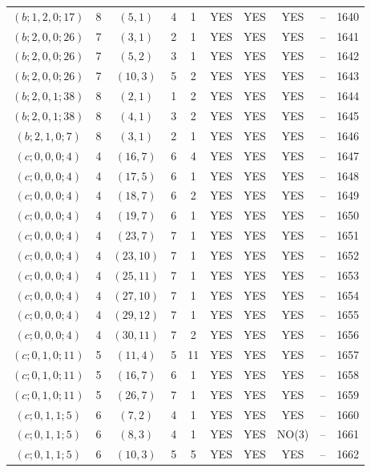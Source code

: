 \begin{longtable}{|c|c|c|c|c|c|c|c|c|c|}
$(b; 1, 2, 0; 17)$ & 8 & $(5, 1)$ & 4 & 1 & YES & YES & YES & -- & 1640\\
$(b; 2, 0, 0; 26)$ & 7 & $(3, 1)$ & 2 & 1 & YES & YES & YES & -- & 1641\\
$(b; 2, 0, 0; 26)$ & 7 & $(5, 2)$ & 3 & 1 & YES & YES & YES & -- & 1642\\
$(b; 2, 0, 0; 26)$ & 7 & $(10, 3)$ & 5 & 2 & YES & YES & YES & -- & 1643\\
$(b; 2, 0, 1; 38)$ & 8 & $(2, 1)$ & 1 & 2 & YES & YES & YES & -- & 1644\\
$(b; 2, 0, 1; 38)$ & 8 & $(4, 1)$ & 3 & 2 & YES & YES & YES & -- & 1645\\
$(b; 2, 1, 0; 7)$ & 8 & $(3, 1)$ & 2 & 1 & YES & YES & YES & -- & 1646\\
$(c; 0, 0, 0; 4)$ & 4 & $(16, 7)$ & 6 & 4 & YES & YES & YES & -- & 1647\\
$(c; 0, 0, 0; 4)$ & 4 & $(17, 5)$ & 6 & 1 & YES & YES & YES & -- & 1648\\
$(c; 0, 0, 0; 4)$ & 4 & $(18, 7)$ & 6 & 2 & YES & YES & YES & -- & 1649\\
$(c; 0, 0, 0; 4)$ & 4 & $(19, 7)$ & 6 & 1 & YES & YES & YES & -- & 1650\\
$(c; 0, 0, 0; 4)$ & 4 & $(23, 7)$ & 7 & 1 & YES & YES & YES & -- & 1651\\
$(c; 0, 0, 0; 4)$ & 4 & $(23, 10)$ & 7 & 1 & YES & YES & YES & -- & 1652\\
$(c; 0, 0, 0; 4)$ & 4 & $(25, 11)$ & 7 & 1 & YES & YES & YES & -- & 1653\\
$(c; 0, 0, 0; 4)$ & 4 & $(27, 10)$ & 7 & 1 & YES & YES & YES & -- & 1654\\
$(c; 0, 0, 0; 4)$ & 4 & $(29, 12)$ & 7 & 1 & YES & YES & YES & -- & 1655\\
$(c; 0, 0, 0; 4)$ & 4 & $(30, 11)$ & 7 & 2 & YES & YES & YES & -- & 1656\\
$(c; 0, 1, 0; 11)$ & 5 & $(11, 4)$ & 5 & 11 & YES & YES & YES & -- & 1657\\
$(c; 0, 1, 0; 11)$ & 5 & $(16, 7)$ & 6 & 1 & YES & YES & YES & -- & 1658\\
$(c; 0, 1, 0; 11)$ & 5 & $(26, 7)$ & 7 & 1 & YES & YES & YES & -- & 1659\\
$(c; 0, 1, 1; 5)$ & 6 & $(7, 2)$ & 4 & 1 & YES & YES & YES & -- & 1660\\
$(c; 0, 1, 1; 5)$ & 6 & $(8, 3)$ & 4 & 1 & YES & YES & NO(3) & -- & 1661\\
$(c; 0, 1, 1; 5)$ & 6 & $(10, 3)$ & 5 & 5 & YES & YES & YES & -- & 1662\\

\end{longtable}
